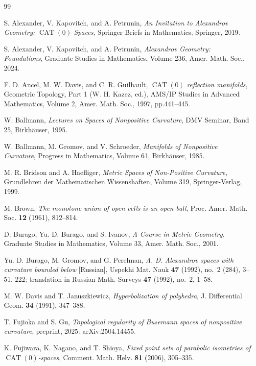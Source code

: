 \documentclass[a4paper,12pt]{amsart}
\newcommand{\CAT}{\operatorname{CAT}}
\numberwithin{equation}{section}
\theoremstyle{plain}
\theoremstyle{definition}
\theoremstyle{remark}
\begin{document}
\begin{thebibliography}{99}

S. Alexander, V. Kapovitch, and A. Petrunin,
\emph{An Invitation to Alexandrov Geometry: $\CAT(0)$ Spaces},
Springer Briefs in Mathematics,
Springer, 2019.

S. Alexander, V. Kapovitch, and A. Petrunin,
\emph{Alexandrov Geometry: Foundations}, 
Graduate Studies in Mathematics, Volume 236, Amer. Math. Soc.,
2024.

F. D. Ancel, M. W. Davis, and C. R. Guilbault,
\emph{$\CAT(0)$ reflection manifolds},
Geometric Topology, Part 1 (W. H. Kazez, ed.),
AMS/IP Studies in Advanced Mathematics, Volume 2,
Amer. Math. Soc., 1997,
pp.441--445.

W. Ballmann,
\emph{Lectures on Spaces of Nonpositive Curvature},
DMV Seminar, Band 25, Birkh\"{a}user, 1995.

W. Ballmann, M. Gromov, and V. Schroeder,
\emph{Manifolds of Nonpositive Curvature},
Progress in Mathematics, Volume 61, Birkh\"{a}user, 1985.

M. R. Bridson and A. Haefliger,
\emph{Metric Spaces of Non-Positive Curvature},
Grundlehren der Mathematischen Wissenshaften,
Volume 319,
Springer-Verlag,
1999.

M. Brown,
\emph{The monotone union of open cells is an open ball},
Proc. Amer. Math. Soc. {\bf 12} (1961), 812--814.

D. Burago, Yu. D. Burago, and S. Ivanov,
\emph{A Course in Metric Geometry},
Graduate Studies in Mathematics, Volume 33, Amer. Math. Soc.,
2001.

Yu. D. Burago, M. Gromov, and G. Perelman,
\emph{A. D. Alexandrov spaces with curvature bounded below}
[Russian],
Uspekhi Mat. Nauk {\bf 47} (1992), no.~2 (284), 3--51, 222;
translation in 
Russian Math. Surveys {\bf 47} (1992), no.~2, 1--58.

M. W. Davis and T. Januszkiewicz,
\emph{Hyperbolization of polyhedra},
J. Differential Geom. {\bf 34} (1991), 347--388.

T. Fujioka and S. Gu,
\emph{Topological regularity of Busemann spaces of nonpositive curvature},
preprint, 2025:
arXiv:2504.14455.

K. Fujiwara, K. Nagano, and T. Shioya,
\emph{Fixed point sets of parabolic isometries of $\CAT(0)$-spaces},
Comment. Math. Helv. {\bf 81} (2006), 305--335.


\end{thebibliography}
\end{document}
